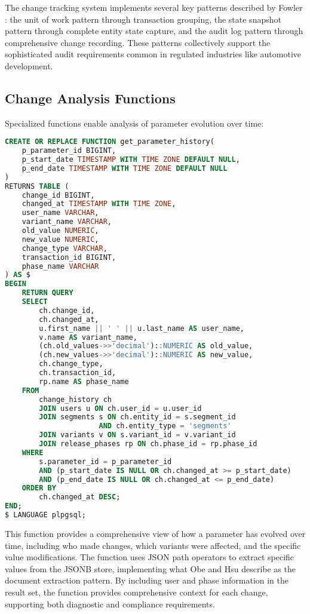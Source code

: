 The change tracking system implements several key patterns described by Fowler \cite{fowler2003patterns}: the unit of work pattern through transaction grouping, the state snapshot pattern through complete entity state capture, and the audit log pattern through comprehensive change recording. These patterns collectively support the sophisticated audit requirements common in regulated industries like automotive development.

\subsection{Change Analysis Functions}
\label{subsec:change-analysis-functions}

Specialized functions enable analysis of parameter evolution over time:

\begin{lstlisting}[language=SQL, caption={Parameter History Function}, label={lst:parameter-history}]
CREATE OR REPLACE FUNCTION get_parameter_history(
    p_parameter_id BIGINT,
    p_start_date TIMESTAMP WITH TIME ZONE DEFAULT NULL,
    p_end_date TIMESTAMP WITH TIME ZONE DEFAULT NULL
)
RETURNS TABLE (
    change_id BIGINT,
    changed_at TIMESTAMP WITH TIME ZONE,
    user_name VARCHAR,
    variant_name VARCHAR,
    old_value NUMERIC,
    new_value NUMERIC,
    change_type VARCHAR,
    transaction_id BIGINT,
    phase_name VARCHAR
) AS $
BEGIN
    RETURN QUERY
    SELECT 
        ch.change_id,
        ch.changed_at,
        u.first_name || ' ' || u.last_name AS user_name,
        v.name AS variant_name,
        (ch.old_values->>'decimal')::NUMERIC AS old_value,
        (ch.new_values->>'decimal')::NUMERIC AS new_value,
        ch.change_type,
        ch.transaction_id,
        rp.name AS phase_name
    FROM 
        change_history ch
        JOIN users u ON ch.user_id = u.user_id
        JOIN segments s ON ch.entity_id = s.segment_id 
                      AND ch.entity_type = 'segments'
        JOIN variants v ON s.variant_id = v.variant_id
        JOIN release_phases rp ON ch.phase_id = rp.phase_id
    WHERE 
        s.parameter_id = p_parameter_id
        AND (p_start_date IS NULL OR ch.changed_at >= p_start_date)
        AND (p_end_date IS NULL OR ch.changed_at <= p_end_date)
    ORDER BY 
        ch.changed_at DESC;
END;
$ LANGUAGE plpgsql;
\end{lstlisting}

This function provides a comprehensive view of how a parameter has evolved over time, including who made changes, which variants were affected, and the specific value modifications. The function uses JSON path operators to extract specific values from the JSONB store, implementing what Obe and Hsu \cite{obe2017postgresql} describe as the document extraction pattern. By including user and phase information in the result set, the function provides comprehensive context for each change, supporting both diagnostic and compliance requirements.

